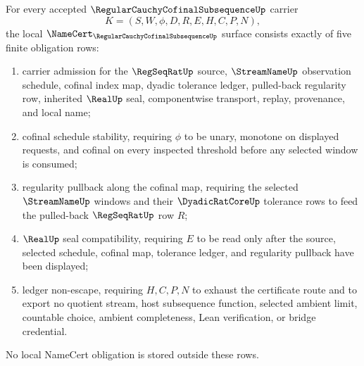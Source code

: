 \begin{theorem}
\label{thm:regular-cauchy-cofinal-subsequence-namecert-obligations}
For every accepted $\RegularCauchyCofinalSubsequenceUp$ carrier
$$
K=(S,W,\phi,D,R,E,H,C,P,N),
$$
the local $\NameCert_{\RegularCauchyCofinalSubsequenceUp}$ surface consists exactly of five finite obligation rows:
\begin{enumerate}
\item carrier admission for the $\RegSeqRatUp$ source, $\StreamNameUp$ observation schedule, cofinal index map, dyadic tolerance ledger, pulled-back regularity row, inherited $\RealUp$ seal, componentwise transport, replay, provenance, and local name;
\item cofinal schedule stability, requiring $\phi$ to be unary, monotone on displayed requests, and cofinal on every inspected threshold before any selected window is consumed;
\item regularity pullback along the cofinal map, requiring the selected $\StreamNameUp$ windows and their $\DyadicRatCoreUp$ tolerance rows to feed the pulled-back $\RegSeqRatUp$ row $R$;
\item $\RealUp$ seal compatibility, requiring $E$ to be read only after the source, selected schedule, cofinal map, tolerance ledger, and regularity pullback have been displayed;
\item ledger non-escape, requiring $H,C,P,N$ to exhaust the certificate route and to export no quotient stream, host subsequence function, selected ambient limit, countable choice, ambient completeness, Lean verification, or bridge credential.
\end{enumerate}
No local NameCert obligation is stored outside these rows.
\end{theorem}
